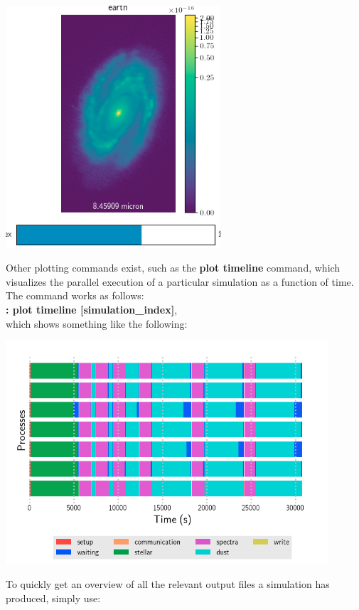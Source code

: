 \documentclass[15pt,a4paper,oneside,openright]{report}
\begin{document}
\begin{center}
\includegraphics[width=0.6\textwidth]{figures/datacube.png}
\end{center}

Other plotting commands exist, such as the \textbf{plot timeline} command, which visualizes the parallel execution of a particular simulation as a function of time. The command works as follows:\\

\textbf{: plot timeline [simulation\_index]},\\

which shows something like the following:

\begin{center}
\includegraphics[width=0.9\textwidth]{figures/timeline.png}
\end{center}

To quickly get an overview of all the relevant output files a simulation has produced, simply use:\\
\end{document}
